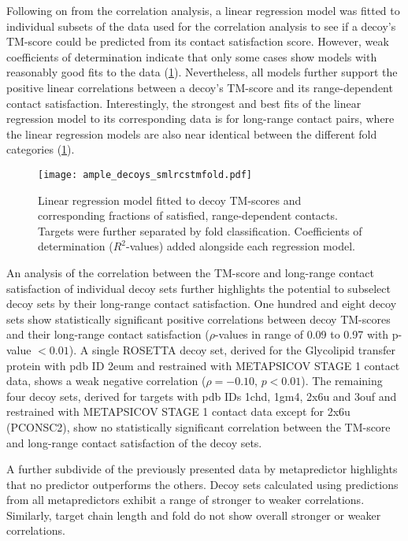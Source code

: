 Following on from the correlation analysis, a linear regression model was fitted to individual subsets of the data used for the correlation analysis to see if a decoy's TM-score could be predicted from its contact satisfaction score. However, weak coefficients of determination indicate that only some cases show models with reasonably good fits to the data (\cref{fig:ample_decoys_smlrcstmfold}). Nevertheless, all models further support the positive linear correlations between a decoy's TM-score and its range-dependent contact satisfaction. Interestingly, the strongest and best fits of the linear regression model to its corresponding data is for long-range contact pairs, where the linear regression models are also near identical between the different fold categories (\cref{fig:ample_decoys_smlrcstmfold}).

\begin{figure}[H]
	\centering
	\texttt{[image: ample\_decoys\_smlrcstmfold.pdf]}
        \caption[Linear regression model between decoy TM-score and contact satisfaction]{Linear regression model fitted to decoy TM-scores and corresponding fractions of satisfied, range-dependent contacts. Targets were further separated by fold classification. Coefficients of determination ($R^2$-values) added alongside each regression model.}
	\label{fig:ample_decoys_smlrcstmfold}
\end{figure}

An analysis of the correlation between the TM-score and long-range contact satisfaction of individual decoy sets further highlights the potential to subselect decoy sets by their long-range contact satisfaction. One hundred and eight decoy sets show statistically significant positive correlations between decoy TM-scores and their long-range contact satisfaction ($\rho$-values in range of 0.09 to 0.97 with p-value $<0.01$). A single ROSETTA decoy set, derived for the Glycolipid transfer protein with \gls{pdb} ID 2eum and restrained with METAPSICOV STAGE 1 contact data, shows a weak negative correlation ($\rho=-0.10$, $p<0.01$). The remaining four decoy sets, derived for targets with \gls{pdb} IDs 1chd, 1gm4, 2x6u and 3ouf and restrained with METAPSICOV STAGE 1 contact data except for 2x6u (PCONSC2), show no statistically significant correlation between the TM-score and long-range contact satisfaction of the decoy sets. 

A further subdivide of the previously presented data by metapredictor highlights that no predictor outperforms the others. Decoy sets calculated using predictions from all metapredictors exhibit a range of stronger to weaker correlations. Similarly, target chain length and fold do not show overall stronger or weaker correlations. 

